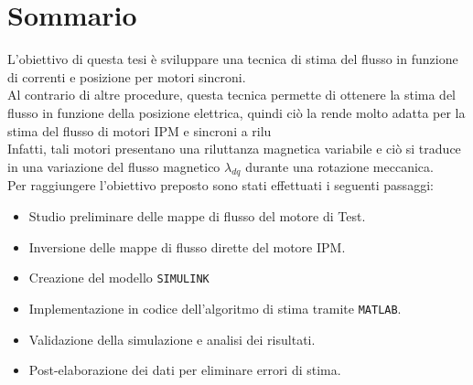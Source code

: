 \documentclass[12pt,a4paper,twoside,openright]{extreport}
\begin{document}
\pagestyle{empty}

\cleardoublepage

\pagestyle{plain}
\chapter*{Sommario}
L'obiettivo di questa tesi è sviluppare una tecnica di stima del flusso in funzione di correnti e posizione per motori sincroni.\\
Al contrario di altre procedure, questa tecnica permette di ottenere la stima del flusso in funzione della posizione elettrica, quindi ciò la rende molto adatta per la stima del flusso di motori IPM e sincroni a rilu\\
Infatti, tali motori presentano una riluttanza magnetica variabile e ciò si traduce in una variazione del flusso magnetico $\lambda_{dq}$ durante una rotazione meccanica. \\
Per raggiungere l'obiettivo preposto sono stati effettuati i seguenti passaggi:
\begin{itemize}
    \item Studio preliminare delle mappe di flusso del motore di Test.
    \item Inversione delle mappe di flusso dirette del motore IPM.
    \item Creazione del modello \texttt{SIMULINK}
    \item Implementazione in codice dell'algoritmo di stima tramite \texttt{MATLAB}.
    \item Validazione della simulazione e analisi dei risultati.
    \item Post-elaborazione dei dati per eliminare errori di stima.
\end{itemize}

\cleardoublepage

\tableofcontents
\cleardoublepage

\listoffigures
\cleardoublepage



\cleardoublepage

\cleardoublepage

\cleardoublepage

\cleardoublepage

\cleardoublepage

\cleardoublepage

\cleardoublepage
%
\printbibliography[heading=bibintoc]
\end{document}
